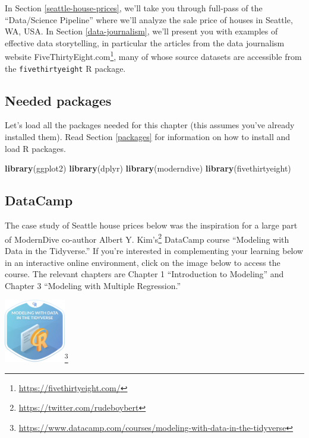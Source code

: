 \documentclass[12pt,]{krantz}
\makeatletter
\newenvironment{Shaded}{\begin{snugshade}}{\end{snugshade}}
\newcommand{\KeywordTok}[1]{\textcolor[rgb]{0.27,0.27,0.27}{\textbf{#1}}}
\newcommand{\NormalTok}[1]{#1}
\renewcommand{\href}[2]{#2\footnote{\url{#1}}}
\newenvironment{kframe}{%
\medskip{}
\setlength{\fboxsep}{.8em}
 \def\at@end@of@kframe{}%
 \ifinner\ifhmode%
  \def\at@end@of@kframe{\end{minipage}}%
  \begin{minipage}{\columnwidth}%
 \fi\fi%
 \def\FrameCommand##1{\hskip\@totalleftmargin \hskip-\fboxsep
 \colorbox{shadecolor}{##1}\hskip-\fboxsep
     \hskip-\linewidth \hskip-\@totalleftmargin \hskip\columnwidth}%
 \MakeFramed {\advance\hsize-\width
   \@totalleftmargin\z@ \linewidth\hsize
   \@setminipage}}%
 {\par\unskip\endMakeFramed%
 \at@end@of@kframe}
\renewenvironment{Shaded}{\begin{kframe}}{\end{kframe}}
\makeatother
\begin{document}
In Section \ref{seattle-house-prices}, we'll take you through full-pass
of the ``Data/Science Pipeline'' where we'll analyze the sale price of
houses in Seattle, WA, USA. In Section \ref{data-journalism}, we'll
present you with examples of effective data storytelling, in particular
the articles from the data journalism website
\href{https://fivethirtyeight.com/}{FiveThirtyEight.com}, many of whose
source datasets are accessible from the \texttt{fivethirtyeight} R
package.

\subsection*{Needed packages}\label{needed-packages-9}


Let's load all the packages needed for this chapter (this assumes you've
already installed them). Read Section \ref{packages} for information on
how to install and load R packages.

\begin{Shaded}
\begin{Highlighting}[]
\KeywordTok{library}\NormalTok{(ggplot2)}
\KeywordTok{library}\NormalTok{(dplyr)}
\KeywordTok{library}\NormalTok{(moderndive)}
\KeywordTok{library}\NormalTok{(fivethirtyeight)}
\end{Highlighting}
\end{Shaded}

\subsection*{DataCamp}\label{datacamp-8}


The case study of Seattle house prices below was the inspiration for a
large part of ModernDive co-author
\href{https://twitter.com/rudeboybert}{Albert Y. Kim's} DataCamp course
``Modeling with Data in the Tidyverse.'' If you're interested in
complementing your learning below in an interactive online environment,
click on the image below to access the course. The relevant chapters are
Chapter 1 ``Introduction to Modeling'' and Chapter 3 ``Modeling with
Multiple Regression.''

\begin{center}
\href{https://www.datacamp.com/courses/modeling-with-data-in-the-tidyverse}{\includegraphics[width=0.2\textwidth]{images/datacamp_intro_to_modeling.png}}
\end{center}
\end{document}
